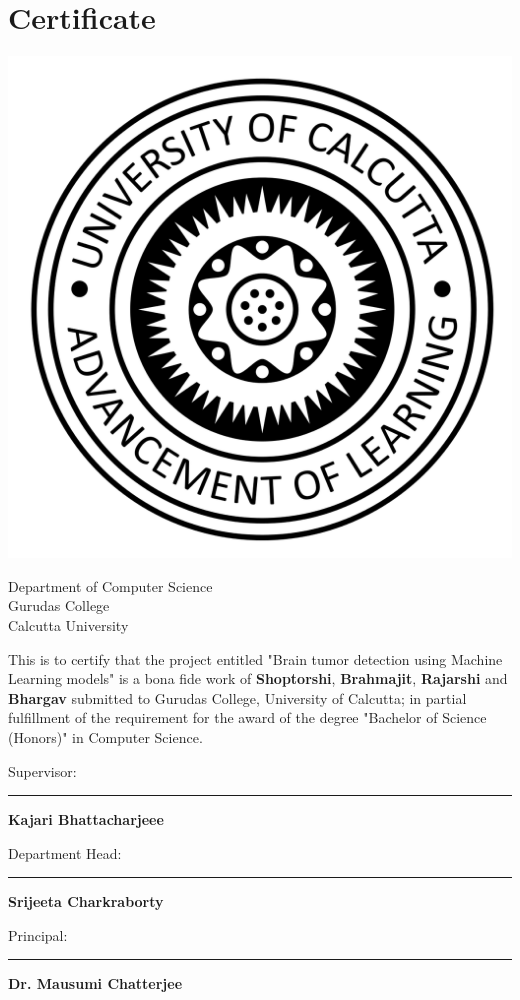 \documentclass[11pt]{article}
\begin{document}
	\section[certificate]{\hfill \Huge Certificate \hfill}


	\begin{center}
		\vspace{1cm}

		\includegraphics[width=0.3\linewidth]{imgs/cu_logo.png}

		\vspace{1cm}

		\Large
		Department of Computer Science\\
		Gurudas College\\
		Calcutta University\\
	\end{center}

	\vspace{1.8cm}
	This is to certify that the project entitled "Brain tumor detection using
	Machine Learning models" is a bona fide work of \textbf{Shoptorshi},
	\textbf{Brahmajit}, \textbf{Rajarshi} and \textbf{Bhargav} submitted to
	Gurudas College, University of Calcutta; in partial fulfillment of the
	requirement for the award of the degree "Bachelor of Science (Honors)" in
	Computer Science.
	\vfill

	\begin{multicols}{2}

		Supervisor:

		\rule{5cm}{0.4pt}

		\textbf{Kajari Bhattacharjeee}

		\vspace{1cm}

		Department Head:

		\rule{5cm}{0.4pt}

		\textbf{Srijeeta Charkraborty}


		\columnbreak

		Principal:

		\rule{5cm}{0.4pt}

		\textbf{Dr. Mausumi Chatterjee}

	\end{multicols}
\end{document}
